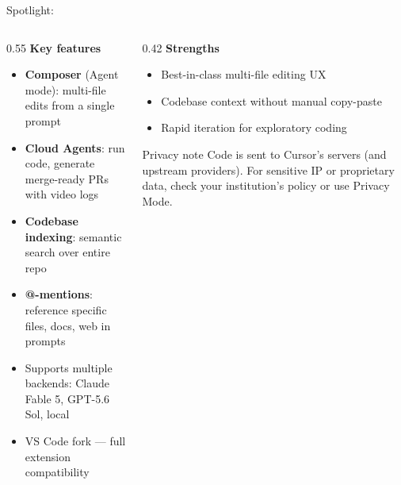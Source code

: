\begin{frame}{Spotlight: }
  \begin{columns}[T, onlytextwidth]
    \begin{column}{0.55\textwidth}
      \textbf{Key features}\\[0.3em]
      \begin{itemize}
        \item \textbf{Composer} (Agent mode): multi-file edits from a single prompt
        \item \textbf{Cloud Agents}: run code, generate merge-ready PRs with video logs
        \item \textbf{Codebase indexing}: semantic search over entire repo
        \item \textbf{@-mentions}: reference specific files, docs, web in prompts
        \item Supports multiple backends: Claude Fable 5, GPT-5.6 Sol, local
        \item VS Code fork — full extension compatibility
      \end{itemize}
      \vspace{0.4em}
    \end{column}
    \hfill
    \begin{column}{0.42\textwidth}
      \small
      \textbf{Strengths}\\
      \begin{itemize}
        \item Best-in-class multi-file editing UX
        \item Codebase context without manual copy-paste
        \item Rapid iteration for exploratory coding
      \end{itemize}
      \vspace{0.2em}
      \begin{alertblock}{Privacy note}
        Code is sent to Cursor's servers (and upstream providers). For sensitive IP or proprietary data, check your institution's policy or use Privacy Mode.
      \end{alertblock}
    \end{column}
  \end{columns}
\end{frame}

